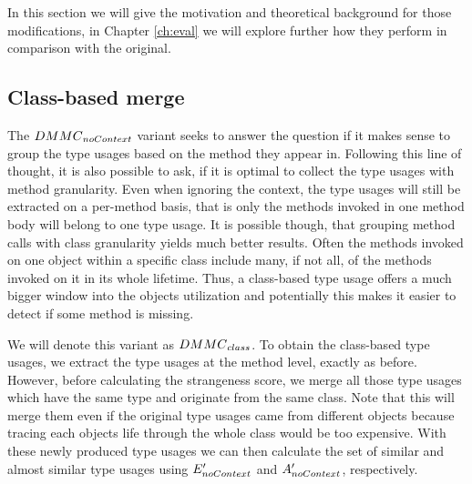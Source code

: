 In this section we will give the motivation and theoretical background for those modifications, in Chapter \ref{ch:eval} we will explore further how they perform in comparison with the original.

\subsection{Class-based merge}


The $\mathnormal{DMMC}_{\mathnormal{noContext}}$ variant seeks to answer the question if it makes sense to group the type usages based on the method they appear in.
Following this line of thought, it is also possible to ask, if it is optimal to collect the type usages with method granularity.
Even when ignoring the context, the type usages will still be extracted on a per-method basis, that is only the methods invoked in one method body will belong to one type usage.
It is possible though, that grouping method calls with class granularity yields much better results.
Often the methods invoked on one object within a specific class include many, if not all, of the methods invoked on it in its whole lifetime.
Thus, a class-based type usage offers a much bigger window into the objects utilization and potentially this makes it easier to detect if some method is missing.

We will denote this variant as $\mathnormal{DMMC}_{\mathnormal{class}}$.
To obtain the class-based type usages, we extract the type usages at the method level, exactly as before.
However, before calculating the strangeness score, we merge all those type usages which have the same type and originate from the same class.
Note that this will merge them even if the original type usages came from different objects because tracing each objects life through the whole class would be too expensive.
With these newly produced type usages we can then calculate the set of similar and almost similar type usages using $E'_{\mathnormal{noContext}}$ and $A'_{\mathnormal{noContext}}$, respectively.

